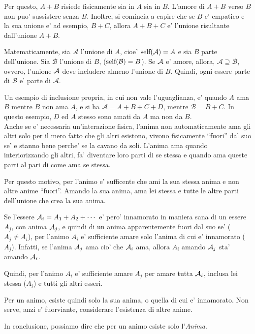 Per questo, $A+B$ risiede fisicamente sia in $A$ sia in $B$. L'amore di $A+B$ verso $B$ non puo' sussistere senza $B$. Inoltre, si comincia a capire che se $B$ e' empatico e la sua unione e' ad esempio, $B+C$, allora $A+B+C$ e' l'unione risultante dall'unione $A+B$.

Matematicamente, sia $\mathcal{A}$ l'unione di $A$, cioe' $\textrm{self}(\mathcal{A})=A$ e sia $B$ parte dell'unione. Sia $\mathcal{B}$ l'unione di $B$, ($\textrm{self}(\mathcal{B})=B$). Se $\mathcal{A}$ e' amore, allora, $\mathcal{A} \supseteq \mathcal{B}$, ovvero, l'unione $\mathcal{A}$ deve includere almeno l'unione di $B$. Quindi, ogni essere parte di $\mathcal{B}$ e' parte di $\mathcal{A}$.

Un esempio di inclusione propria, in cui non vale l'uguaglianza, e' quando $A$ ama $B$ mentre $B$ non ama $A$, e si ha $\mathcal{A}=A+B+C+D$, mentre $\mathcal{B}=B+C$. In questo esempio, $D$ ed $A$ stesso sono amati da $A$ ma non da $B$.\\

Anche se e' necessaria un'interazione fisica, l'anima non automaticamente ama gli altri solo per il mero fatto che gli altri esistono, vivono fisicamente ``fuori'' dal suo se' e stanno bene perche' se la cavano da soli. L'anima ama quando interiorizzando gli altri, fa' diventare loro parti di se stessa e quando ama queste parti al pari di come ama se stessa.

Per questo motivo, per l'animo e' sufficente che ami la sua stessa anima e non altre anime ``fuori''. Amando la sua anima, ama lei stessa e tutte le altre parti dell'unione che crea la sua anima.

Se l'essere $\mathcal{A}_i=A_1+A_2+\cdots$ e' pero' innamorato in maniera sana di un essere $A_j$, con anima $\mathcal{A}_j$, e quindi di un anima apparentemente fuori dal suo se' ($A_j\ne A_i$), per l'animo $A_i$ e' sufficiente amare solo l'anima di cui e' innamorato ($A_j$). Infatti, se l'anima $\mathcal{A}_j$ ama cio' che $\mathcal{A}_i$ ama, allora $A_i$ amando $\mathcal{A}_j$ sta' amando $\mathcal{A}_i$.

Quindi, per l'animo $A_i$ e' sufficiente amare $A_j$ per amare tutta $\mathcal{A}_i$, inclusa lei stessa ($A_i$) e tutti gli altri esseri.

Per un animo, esiste quindi solo la sua anima, o quella di cui e' innamorato. Non serve, anzi e' fuorviante, considerare l'esistenza di altre anime.

In conclusione, possiamo dire che per un animo esiste solo l'\emph{Anima}.

